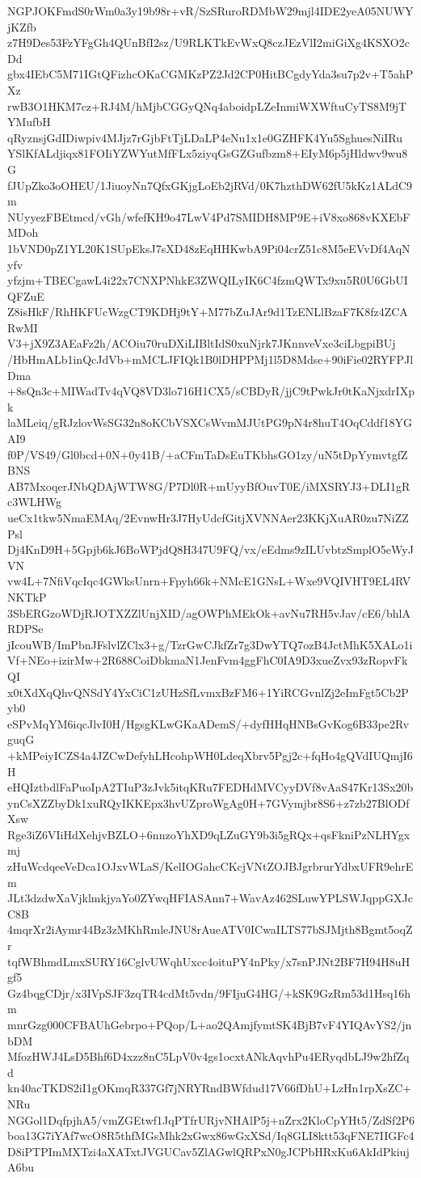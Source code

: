 NGPJOKFmdS0rWm0a3y19b98r+vR/SzSRuroRDMbW29mjl4IDE2yeA05NUWYjKZfb
z7H9Des53FzYFgGh4QUnBfI2sz/U9RLKTkEvWxQ8czJEzVlI2miGiXg4KSXO2cDd
gbx4IEbC5M71IGtQFizhcOKaCGMKzPZ2Jd2CP0HitBCgdyYda3su7p2v+T5ahPXz
rwB3O1HKM7cz+RJ4M/hMjbCGGyQNq4aboidpLZeInmiWXWftuCyTS8M9jTYMufbH
qRyznsjGdIDiwpiv4MJjz7rGjbFtTjLDaLP4eNu1x1e0GZHFK4Yu5SghuesNiIRu
YSlKfALdjiqx81FOIiYZWYutMfFLx5ziyqGsGZGufbzm8+EIyM6p5jHldwv9wu8G
fJUpZko3oOHEU/1JiuoyNn7QfxGKjgLoEb2jRVd/0K7hzthDW62fU5kKz1ALdC9m
NUyyezFBEtmcd/vGh/wfefKH9o47LwV4Pd7SMIDH8MP9E+iV8xo868vKXEbFMDoh
1bVND0pZ1YL20K1SUpEksJ7sXD48zEqHHKwbA9Pi04crZ51c8M5eEVvDf4AqNyfv
yfzjm+TBECgawL4i22x7CNXPNhkE3ZWQILyIK6C4fzmQWTx9xu5R0U6GbUIQFZuE
Z8isHkF/RhHKFUcWzgCT9KDHj9tY+M77bZuJAr9d1TzENLlBzaF7K8fz4ZCARwMI
V3+jX9Z3AEaFz2h/ACOiu70ruDXiLIBltIdS0xuNjrk7JKnnveVxe3ciLbgpiBUj
/HbHmALb1inQcJdVb+mMCLJFIQk1B0lDHPPMj1l5D8Mdse+90iFie02RYFPJlDma
+8sQn3c+MIWadTv4qVQ8VD3lo716H1CX5/sCBDyR/jjC9tPwkJr0tKaNjxdrIXpk
laMLeiq/gRJzlovWsSG32n8oKCbVSXCsWvmMJUtPG9pN4r8huT4OqCddf18YGAI9
f0P/VS49/Gl0bcd+0N+0y41B/+aCFmTaDsEuTKbhsGO1zy/uN5tDpYymvtgfZBNS
AB7MxoqerJNbQDAjWTW8G/P7Dl0R+mUyyBfOuvT0E/iMXSRYJ3+DLI1gRc3WLHWg
ueCx1tkw5NmaEMAq/2EvnwHr3J7HyUdcfGitjXVNNAer23KKjXuAR0zu7NiZZPsl
Dj4KnD9H+5Gpjb6kJ6BoWPjdQ8H347U9FQ/vx/eEdms9zILUvbtzSmplO5eWyJVN
vw4L+7NfiVqcIqc4GWksUnrn+Fpyh66k+NMcE1GNsL+Wxe9VQIVHT9EL4RVNKTkP
3SbERGzoWDjRJOTXZZlUnjXID/agOWPhMEkOk+avNu7RH5vJav/cE6/bhlARDPSe
jIcouWB/ImPbnJFslvlZClx3+g/TzrGwCJkfZr7g3DwYTQ7ozB4JctMhK5XALo1i
Vf+NEo+izirMw+2R688CoiDbkmaN1JenFvm4ggFhC0IA9D3xueZvx93zRopvFkQI
x0tXdXqQhvQNSdY4YxCiC1zUHzSfLvmxBzFM6+1YiRCGvnlZj2eImFgt5Cb2Pyb0
eSPvMqYM6iqcJlvI0H/HgsgKLwGKaADemS/+dyfHHqHNBsGvKog6B33pe2RvguqG
+kMPeiyICZS4a4JZCwDefyhLHcohpWH0LdeqXbrv5Pgj2c+fqHo4gQVdIUQmjI6H
eHQIztbdlFaPuoIpA2TIuP3zJvk5itqKRu7FEDHdMVCyyDVf8vAaS47Kr13Sx20b
ynCsXZZbyDk1xuRQyIKKEpx3hvUZproWgAg0H+7GVymjbr8S6+z7zb27BlODfXsw
Rge3iZ6VIiHdXehjvBZLO+6nnzoYhXD9qLZuGY9b3i5gRQx+qsFkniPzNLHYgxmj
zHuWcdqeeVeDca1OJxvWLaS/KelIOGahcCKcjVNtZOJBJgrbrurYdbxUFR9ehrEm
JLt3dzdwXaVjklmkjyaYo0ZYwqHFIASAnn7+WavAz462SLuwYPLSWJqppGXJcC8B
4mqrXr2iAymr44Bz3zMKhRmleJNU8rAueATV0ICwaILTS77bSJMjth8Bgmt5oqZr
tqfWBhmdLmxSURY16CglvUWqhUxcc4oituPY4nPky/x7snPJNt2BF7H94H8uHgf5
Gz4bqgCDjr/x3IVpSJF3zqTR4cdMt5vdn/9FIjuG4HG/+kSK9GzRm53d1Hsq16hm
mnrGzg000CFBAUhGebrpo+PQop/L+ao2QAmjfymtSK4BjB7vF4YIQAvYS2/jnbDM
MfozHWJ4LsD5Bhf6D4xzz8nC5LpV0v4gs1ocxtANkAqvhPu4ERyqdbLJ9w2hfZqd
kn40acTKDS2iI1gOKmqR337Gf7jNRYRndBWfdud17V66fDhU+LzHn1rpXsZC+NRu
NGGol1DqfpjhA5/vmZGEtwf1JqPTfrURjvNHAlP5j+nZrx2KloCpYHt5/ZdSf2P6
boa13G7iYAf7wcO8R5thfMGsMhk2xGwx86wGxXSd/Iq8GLI8ktt53qFNE7IIGFc4
D8iPTPImMXTzi4aXATxtJVGUCav5ZlAGwlQRPxN0gJCPbHRxKu6AkIdPkiujA6bu

